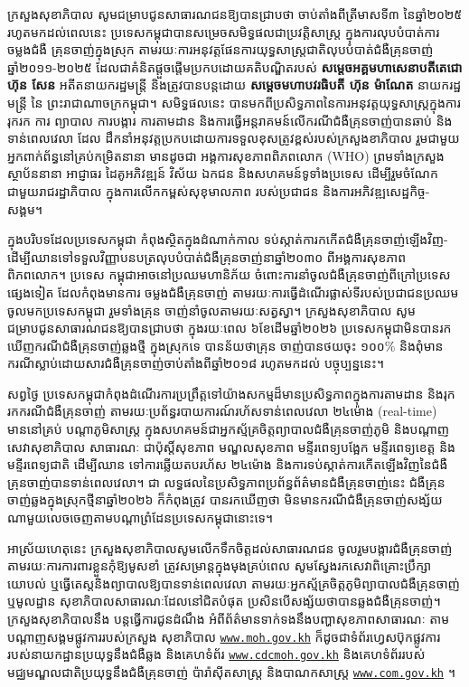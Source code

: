 ក្រសួងសុខាភិបាល សូមជម្រាបជូនសាធារណជនឱ្យបានជ្រាបថា ចាប់តាំងពីត្រីមាសទី៣ នៃឆ្នាំ២០២៥ រហូតមកដល់ពេលនេះ ប្រទេសកម្ពុជាបានសម្រេចសមិទ្ធផលជាប្រវត្តិសាស្ត្រ ក្នុងការលុបបំបាត់ការចម្លងជំងឺ គ្រុនចាញ់ក្នុងស្រុក តាមរយៈការអនុវត្តផែនការយុទ្ធសាស្ត្រជាតិលុបបំបាត់ជំងឺគ្រុនចាញ់ ឆ្នាំ២០១១-២០២៥ ដែលជាគំនិតផ្តួចផ្តើមប្រកបដោយគតិបណ្ឌិតរបស់ \textbf{សម្តេចអគ្គមហាសេនាបតីតេជោ ហ៊ុន សែន} អតីតនាយករដ្ឋមន្ត្រី និងត្រូវបានបន្តដោយ \textbf{សម្តេចមហាបវរធិបតី ហ៊ុន ម៉ាណែត} នាយករដ្ឋមន្ត្រី នៃ ព្រះរាជាណាចក្រកម្ពុជា។ សមិទ្ធផលនេះ បានមកពីប្រសិទ្ធភាពនៃការអនុវត្តយុទ្ធសាស្ត្រក្នុងការរុករក ការ ព្យាបាល ការបង្ការ ការតាមដាន និងការធ្វើអន្តរាគមន៍លើករណីជំងឺគ្រុនចាញ់បានឆាប់ និងទាន់ពេលវេលា ដែល ដឹកនាំអនុវត្តប្រកបដោយការទទួលខុសត្រូវខ្ពស់របស់ក្រសួងខាភិបាល រួមជាមួយអ្នកពាក់ព័ន្ធនៅគ្រប់កម្រិតនានា មានដូចជា អង្គការសុខភាពពិភពលោក (WHO) ព្រមទាំងក្រសួង ស្ថាប័ននានា អាជ្ញាធរ ដៃគូអភិវឌ្ឍន៍ វិស័យ ឯកជន និងសហគមន៍ទូទាំងប្រទេស ដើម្បីរួមចំណែកជាមួយរាជរដ្ឋាភិបាល ក្នុងការលើកកម្ពស់សុខុមាលភាព របស់ប្រជាជន និងការអភិវឌ្ឍសេដ្ឋកិច្ច-សង្គម។\par
ក្នុងបរិបទដែលប្រទេសកម្ពុជា កំពុងស្ថិតក្នុងដំណាក់កាល ទប់ស្កាត់ការកកើតជំងឺគ្រុនចាញ់ឡើងវិញ-ដើម្បីឈានទៅទទួលវិញ្ញាបនបត្រលុបបំបាត់ជំងឺគ្រុនចាញ់នាឆ្នាំ២០៣០ ពីអង្គការសុខភាពពិភពលោក។ ប្រទេស កម្ពុជាអាចនៅប្រឈមហានិភ័យ ចំពោះការនាំចូលជំងឺគ្រុនចាញ់ពីក្រៅប្រទេសផ្សេងទៀត ដែលកំពុងមានការ ចម្លងជំងឺគ្រុនចាញ់ តាមរយៈការធ្វើដំណើរផ្លាស់ទីរបស់ប្រជាជនប្រឈម ចូលមកប្រទេសកម្ពុជា រួមទាំងគ្រុន ចាញ់នាំចូលតាមរយៈសត្វស្វា។ ក្រសួងសុខាភិបាល សូមជម្រាបជូនសាធារណជនឱ្យបានជ្រាបថា ក្នុងរយៈពេល ៦ខែដើមឆ្នាំ២០២៦ ប្រទេសកម្ពុជាមិនបានរកឃើញករណីជំងឺគ្រុនចាញ់ឆ្លងថ្មី ក្នុងស្រុកទេ បានន័យថាគ្រុន ចាញ់បានថយចុះ {១០០\%} និងពុំមានករណីស្លាប់ដោយសារជំងឺគ្រុនចាញ់ចាប់តាំងពីឆ្នាំ២០១៨ រហូតមកដល់ បច្ចុប្បន្ននេះ។\par
សព្វថ្ងៃ ប្រទេសកម្ពុជាកំពុងដំណើរការប្រព្រឹត្តទៅយ៉ាងសកម្មដ៏មានប្រសិទ្ធភាពក្នុងការតាមដាន និងរុក រកករណីជំងឺគ្រុនចាញ់ តាមរយៈប្រព័ន្ធរបាយការណ៍រហ័សទាន់ពេលវេលា ២៤ម៉ោង (real-time) មាននៅគ្រប់ បណ្តាភូមិសាស្ត្រ ក្នុងសហគមន៍ជាអ្នកស្ម័គ្រចិត្តព្យាបាលជំងឺគ្រុនចាញ់ភូមិ និងបណ្តាញសេវាសុខាភិបាល សាធារណៈ ជាប៉ុស្តិ៍សុខភាព មណ្ឌលសុខភាព មន្ទីរពេទ្យបង្អែក មន្ទីរពេទ្យខេត្ត និងមន្ទីរពេទ្យជាតិ ដើម្បីឈាន ទៅការឆ្លើយតបរហ័ស ២៤ម៉ោង និងការទប់ស្កាត់ការកើតឡើងវិញនៃជំងឺគ្រុនចាញ់បានទាន់ពេលវេលា។ ជា លទ្ធផលនៃប្រសិទ្ធភាពប្រព័ន្ធព័ត៌មានជំងឺគ្រុនចាញ់នេះ ជំងឺគ្រុនចាញ់ឆ្លងក្នុងស្រុកថ្មីនាឆ្នាំ២០២៦ ក៏កំពុងត្រូវ បានរកឃើញថា មិនមានករណីជំងឺគ្រុនចាញ់សង្ស័យណាមួយលេចចេញតាមបណ្តាព្រំដែនប្រទេសកម្ពុជានោះទេ។\par
អាស្រ័យហេតុនេះ ក្រសួងសុខាភិបាលសូមលើកទឹកចិត្តដល់សាធារណជន ចូលរួមបង្ការជំងឺគ្រុនចាញ់ តាមរយៈការការពារខ្លួនកុំឱ្យមូសខាំ ត្រូវសម្រាន្តក្នុងមុងគ្រប់ពេល សូមស្វែងរកសេវាពិគ្រោះប្រឹក្សាយោបល់ ឬធ្វើតេស្តនិងព្យាបាលឱ្យបានទាន់ពេលវេលា តាមរយៈអ្នកស្ម័គ្រចិត្តភូមិព្យាបាលជំងឺគ្រុនចាញ់ ឬមូលដ្ឋាន សុខាភិបាលសាធារណៈដែលនៅជិតបំផុត ប្រសិនបើសង្ស័យថាបានឆ្លងជំងឺគ្រុនចាញ់។ ក្រសួងសុខាភិបាលនឹង បន្តធ្វើការជូនដំណឹង អំពីព័ត៌មានទាក់ទងនឹងបញ្ហាសុខភាពសាធារណៈ តាមបណ្តាញសង្គមផ្លូវការរបស់ក្រសួង សុខាភិបាល \href{https://www.moh.gov.kh}{\nolinkurl{www.moh.gov.kh}} ក៏ដូចជាទំព័រហ្វេសប៊ុកផ្លូវការរបស់នាយកដ្ឋានប្រយុទ្ធនឹងជំងឺឆ្លង និងគេហទំព័រ \href{https://www.cdcmoh.gov.kh}{\nolinkurl{www.cdcmoh.gov.kh}} និងគេហទំព័ររបស់មជ្ឈមណ្ឌលជាតិប្រយុទ្ធនឹងជំងឺគ្រុនចាញ់ ប៉ារ៉ាស៊ីតសាស្ត្រ និងបាណកសាស្ត្រ \href{https://www.com.gov.kh}{\nolinkurl{www.com.gov.kh}} ។
